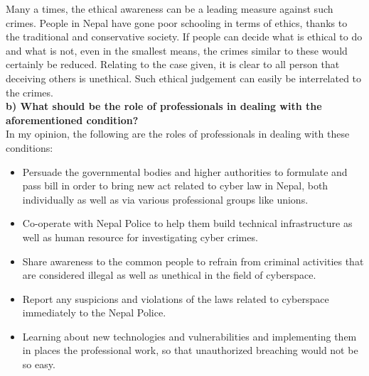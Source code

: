 \documentclass [12pt, a4paper]{article}
\begin{document}
\par
Many a times, the ethical awareness can be a leading measure against such crimes. People in Nepal have gone poor schooling in terms of ethics, thanks to the traditional and conservative society. If people can decide what is ethical to do and what is not, even in the smallest means, the crimes similar to these would certainly be reduced. Relating to the case given, it is clear to all person that deceiving others is unethical. Such ethical judgement can easily be interrelated to the crimes.\\

\textbf{b) What should be the role of professionals in dealing with the aforementioned condition?} \\
In my opinion, the following are the roles of professionals in dealing with these conditions:
\begin{itemize}
	\item Persuade the governmental bodies and higher authorities to formulate and pass bill in order to bring new act related to cyber law in Nepal, both individually as well as via various professional groups like unions.
	\item Co-operate with Nepal Police to help them build technical infrastructure as well as human resource for investigating cyber crimes.
	\item Share awareness to the common people to refrain from criminal activities that are considered illegal as well as unethical in the field of cyberspace.
	\item Report any suspicions and violations of the laws related to cyberspace immediately to the Nepal Police.
	\item Learning about new technologies and vulnerabilities and implementing them in places the professional work, so that unauthorized breaching would not be so easy.
\end{itemize}
\end{document}
